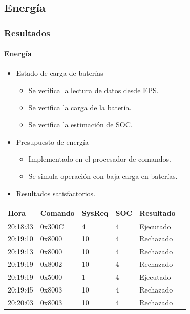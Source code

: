 \documentclass[xcolor=dvipsnames]{beamer}
\begin{document}
    \subsection{Energía}
    \begin{frame}
        \frametitle{Resultados}
        \framesubtitle{Energía}
        
        \begin{itemize}
            \item Estado de carga de baterías
            \begin{itemize}
                \item Se verifica la lectura de datos desde EPS.
                \item Se verifica la carga de la batería.
                \item Se verifica la estimación de SOC.
            \end{itemize}

            \item Presupuesto de energía
            \begin{itemize}
                \item Implementado en el procesador de comandos.
                \item Se simula operación con baja carga en baterías.
            \end{itemize}
            \item Resultados satisfactorios.
        \end{itemize}
                
        \small
        \begin{table}[b]
        \centering
        \begin{tabular}{llllll}
        \hline
        \textbf{Hora} & \textbf{Comando} & \textbf{SysReq} & \textbf{SOC} & \textbf{Resultado} \\ \hline
        20:18:33 & 0x300C &  4 & 4  & Ejecutado \\
        20:19:10 & 0x8000 & 10 & 4  & Rechazado \\
        20:19:13 & 0x8000 &  10 & 4  & Rechazado \\
        20:19:19 & 0x8002 &  10 & 4  & Rechazado \\
        20:19:19 & 0x5000 &  1 & 4  & Ejecutado \\
        20:19:45 & 0x8003 &  10 & 4  & Rechazado \\
        20:20:03 & 0x8003 &  10 & 4  & Rechazado \\ \hline
        \end{tabular} \label{ch5:table:test_soc}
        \end{table}

    \end{frame}
    
\end{document}
